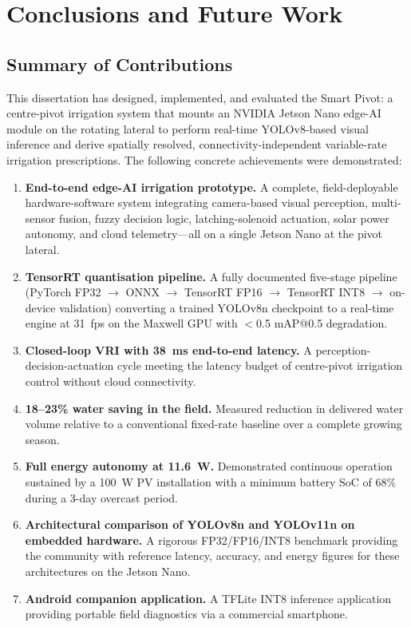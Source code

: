 \documentclass[12pt,a4paper]{report}
\begin{document}
\chapter{Conclusions and Future Work}
\label{ch:conclusion}
\pagestyle{fancy}
\thispagestyle{empty}

\section{Summary of Contributions}

This dissertation has designed, implemented, and evaluated the Smart Pivot: a centre-pivot irrigation system that mounts an NVIDIA Jetson Nano edge-AI module on the rotating lateral to perform real-time YOLOv8-based visual inference and derive spatially resolved, connectivity-independent variable-rate irrigation prescriptions. The following concrete achievements were demonstrated:

\begin{enumerate}[label=\textbf{C\arabic*.}]
    \item \textbf{End-to-end edge-AI irrigation prototype.} A complete, field-deployable hardware-software system integrating camera-based visual perception, multi-sensor fusion, fuzzy decision logic, latching-solenoid actuation, solar power autonomy, and cloud telemetry---all on a single Jetson Nano at the pivot lateral.

    \item \textbf{TensorRT quantisation pipeline.} A fully documented five-stage pipeline (PyTorch FP32 $\to$ ONNX $\to$ TensorRT FP16 $\to$ TensorRT INT8 $\to$ on-device validation) converting a trained YOLOv8n checkpoint to a real-time engine at 31~fps on the Maxwell GPU with $<$0.5 mAP@0.5 degradation.

    \item \textbf{Closed-loop VRI with 38~ms end-to-end latency.} A perception-decision-actuation cycle meeting the latency budget of centre-pivot irrigation control without cloud connectivity.

    \item \textbf{18--23\% water saving in the field.} Measured reduction in delivered water volume relative to a conventional fixed-rate baseline over a complete growing season.

    \item \textbf{Full energy autonomy at 11.6~W.} Demonstrated continuous operation sustained by a 100~W PV installation with a minimum battery SoC of 68\% during a 3-day overcast period.

    \item \textbf{Architectural comparison of YOLOv8n and YOLOv11n on embedded hardware.} A rigorous FP32/FP16/INT8 benchmark providing the community with reference latency, accuracy, and energy figures for these architectures on the Jetson Nano.

    \item \textbf{Android companion application.} A TFLite INT8 inference application providing portable field diagnostics via a commercial smartphone.
\end{enumerate}
\end{document}
